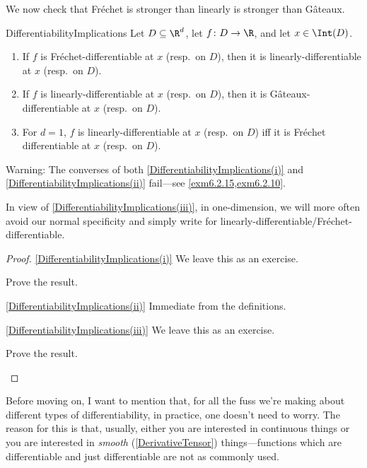 We now check that Fréchet is stronger than linearly is stronger than Gâteaux.
\begin{prp}{}{DifferentiabilityImplications}
	Let $D\subseteq \R ^d$, let $f\colon D\rightarrow \R$, and let $x\in \Int (D)$.
	\begin{enumerate}
		\item \label{DifferentiabilityImplications(i)}If $f$ is Fréchet-differentiable at $x$ (resp.~on $D$), then it is linearly-differentiable at $x$ (resp.~on $D$).
		\item \label{DifferentiabilityImplications(ii)}If $f$ is linearly-differentiable at $x$ (resp.~on $D$), then it is Gâteaux-differentiable at $x$ (resp.~on $D$).
		\item \label{DifferentiabilityImplications(iii)}For $d=1$, $f$ is linearly-differentiable at $x$ (resp.~on $D$) iff it is Fréchet differentiable at $x$ (resp.~on $D$).
	\end{enumerate}
	\begin{wrn}
		Warning:  The converses of both \cref{DifferentiabilityImplications(i)} and \cref{DifferentiabilityImplications(ii)} fail---see \cref{exm6.2.15,exm6.2.10}.
	\end{wrn}
	\begin{rmk}
		In view of \cref{DifferentiabilityImplications(iii)}, in one-dimension, we will more often avoid our normal specificity and simply write  for linearly-differentiable/Fréchet-differentiable.
	\end{rmk}
	\begin{proof}
		\cref{DifferentiabilityImplications(i)} We leave this as an exercise.
		\begin{exr}[breakable=false]{}{}
			Prove the result.
		\end{exr}
		
		\blni
		\cref{DifferentiabilityImplications(ii)} Immediate from the definitions.
		
		\blni
		\cref{DifferentiabilityImplications(iii)} We leave this as an exercise.
		\begin{exr}[breakable=false]{}{}
			Prove the result.
		\end{exr}
	\end{proof}
\end{prp}

Before moving on, I want to mention that, for all the fuss we're making about different types of differentiability, in practice, one doesn't need to worry.  The reason for this is that, usually, either you are interested in continuous things or you are interested in \emph{smooth} (\cref{DerivativeTensor}) things---functions which are differentiable and just differentiable are not as commonly used.

